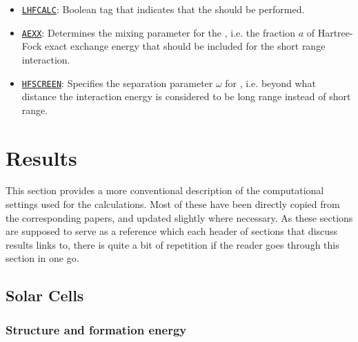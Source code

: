 \begin{refsection}
\begin{itemize}
 \label{appendix:sec-LHFCALC} 
\item \href{https://cms.mpi.univie.ac.at/wiki/index.php/LHFCALC}{\texttt{LHFCALC}}: 
Boolean tag that indicates that the  should be performed. 

 \label{appendix:sec-AEXX} 
\item \href{https://cms.mpi.univie.ac.at/wiki/index.php/AEXX}{\texttt{AEXX}}: 
Determines the mixing parameter for the , 
i.e. the fraction $a$ of Hartree-Fock exact exchange energy that should be 
included for the short range interaction.

 \label{appendix:sec-HFSCREEN} 
\item \href{https://cms.mpi.univie.ac.at/wiki/index.php/HFSCREEN}{\texttt{HFSCREEN}}: 
Specifies the separation parameter $\omega$ for 
, i.e. beyond what distance the 
interaction energy is considered to be long range instead of short range.

\end{itemize} 

\pagebreak[4]
\section{Results} \label{appendix:sec-results} 

This section provides a more conventional description of the computational 
settings used for the calculations. Most of these have been directly copied 
from the corresponding papers, and updated slightly where necessary. As these 
sections are supposed to serve as a reference which each header of sections 
that discuss results links to, there is quite a bit of repetition if the reader 
goes through this section in one go.

\subsection{Solar Cells} \label{appendix:sec-solar} 

\subsubsection{Structure and formation energy} \label{appendix:sec-solar_structure} 
 

\end{refsection}
